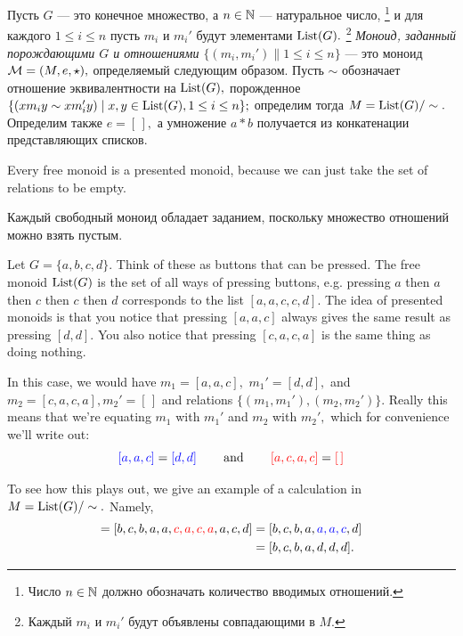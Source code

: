 \documentclass[CT4S-EN-RU]{subfiles}
\begin{document}
\begin{definitionRUS}\label{def:presented monoid}
Пусть $G$ — это конечное множество, а $n\in{\mathbb N}$ — натуральное число,%
\footnote{Число $n\in{\mathbb N}$ должно обозначать количество вводимых отношений.}
и для каждого $1\leq i\leq n$ пусть $m_i$ и $m_i'$ будут элементами $\operatorname{List}(G).$%
\footnote{Каждый $m_i$ и $m_i'$ будут объявлены совпадающими в $M.$}
{\em Моноид, заданный порождающими $G$ и отношениями $\{(m_i,m_i')\|1\leq i\leq n\}$} — это моноид $\mathcal{M}=(M,e,\star),$ определяемый следующим образом. Пусть $\sim$ обозначает отношение эквивалентности на $\operatorname{List}(G),$ порожденное $\{(xm_iy\sim xm_i'y){\;|\;}x,y\in\operatorname{List}(G), 1\leq i\leq n\};$ определим тогда $M=\operatorname{List}(G)/\sim.$ Определим также $e=[\,],$ а умножение $a * b$ получается из конкатенации представляющих списков. 
\end{definitionRUS}

\begin{remarkENG}
Every free monoid is a presented monoid, because we can just take the set of relations to be empty.
\end{remarkENG}

\begin{remarkRUS}
Каждый свободный моноид обладает заданием, поскольку множество отношений можно взять пустым.
\end{remarkRUS}

\begin{exampleENG}\label{ex:presented monoid}
Let $G=\{a,b,c,d\}.$ Think of these as buttons that can be pressed. The free monoid $\operatorname{List}(G)$ is the set of all ways of pressing buttons, e.g. pressing $a$ then $a$ then $c$ then $c$ then $d$ corresponds to the list $[a,a,c,c,d].$ The idea of presented monoids is that you notice that pressing $[a,a,c]$ always gives the same result as pressing $[d,d].$ You also notice that pressing $[c,a,c,a]$ is the same thing as doing nothing.

In this case, we would have $m_1=[a,a,c],$ $m_1'=[d,d],$ and $m_2=[c,a,c,a], m_2'=[\,]$ and relations $\{(m_1,m_1'), (m_2,m_2')\}.$ Really this means that we're equating $m_1$ with $m_1'$ and $m_2$ with $m_2',$ which for convenience we'll write out:
$${\color{blue}{[a,a,c]}}={\color{blue}{[d,d]}}\hspace{.3in}\textnormal{and}\hspace{.3in}{\color{red}{[a,c,a,c]}}={\color{red}{[\,]}}
$$

To see how this plays out, we give an example of a calculation in $M=\operatorname{List}(G)/\sim.$ Namely,
\begin{align*}
[b,c,b,{\color{blue}{d,d}},a,c,a,a,c,d] = [b,c,b,a,a,{\color{red}{c,a,c,a}},a,c,d] &= [b,c,b,a,{\color{blue}{a,a,c}},d]\\
&= [b,c,b,a,d,d,d].
\end{align*}
\end{exampleENG}
\end{document}
